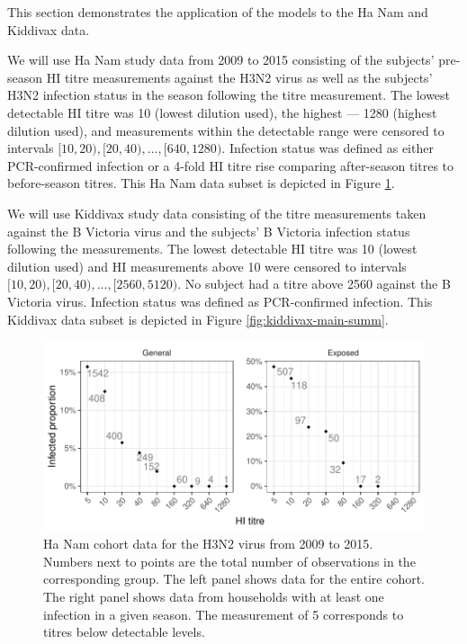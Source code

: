 This section demonstrates the application of the models to the Ha Nam and Kiddivax data.

We will use Ha Nam study data from 2009 to 2015 consisting of the subjects' pre-season HI titre measurements against the H3N2 virus as well as the subjects' H3N2 infection status in the season following the titre measurement. The lowest detectable HI titre was 10 (lowest dilution used), the highest --- 1280 (highest dilution used), and measurements within the detectable range were censored to intervals $[10, 20), [20, 40), ..., [640, 1280)$. Infection status was defined as either PCR-confirmed infection or a 4-fold HI titre rise comparing after-season titres to before-season titres. This Ha Nam data subset is depicted in Figure \ref{fig:hanam-hi-summ-h3n2}.

We will use Kiddivax study data consisting of the titre measurements taken against the B Victoria virus and the subjects' B Victoria infection status following the measurements. The lowest detectable HI titre was 10 (lowest dilution used) and HI measurements above 10 were censored to intervals $[10, 20), [20, 40), ..., [2560, 5120)$. No subject had a titre above 2560 against the B Victoria virus. Infection status was defined as PCR-confirmed infection. This Kiddivax data subset is depicted in Figure \ref{fig:kiddivax-main-summ}.

\begin{figure}[htp]
    \centering
    \includegraphics[width=1\textwidth]{../data-plot/hanam-hi-summ-h3n2-light.pdf}
    \caption{
        Ha Nam cohort data for the H3N2 virus from 2009 to 2015. Numbers next to points are the total number of observations in the corresponding group. The left panel shows data for the entire cohort. The right panel shows data from households with at least one infection in a given season. The measurement of 5 corresponds to titres below detectable levels.
    }
    \label{fig:hanam-hi-summ-h3n2}
\end{figure}

